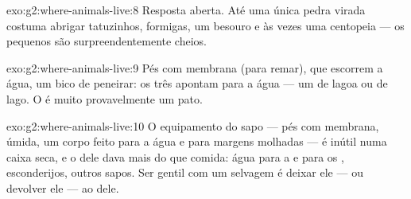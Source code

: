 \begin{solution}{exo:g2:where-animals-live:8}
Resposta aberta. Até uma única pedra virada costuma abrigar
tatuzinhos, formigas, um besouro e às vezes uma centopeia --- os
 pequenos são surpreendentemente cheios.
\end{solution}

\begin{solution}{exo:g2:where-animals-live:9}
Pés com membrana (para remar),  que escorrem a água, um bico de
peneirar: os três apontam para a água --- um  de lagoa ou de
lago. O  é muito provavelmente um pato.
\end{solution}

\begin{solution}{exo:g2:where-animals-live:10}
O equipamento do sapo --- pés com membrana,  úmida, um corpo
feito para a água e para margens molhadas --- é inútil numa caixa
seca, e o  dele dava mais do que comida: água para a  e
para os , esconderijos, outros sapos. Ser gentil com um 
selvagem é deixar ele --- ou devolver ele --- ao  dele.
\end{solution}
